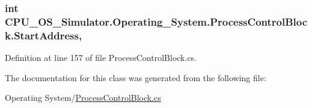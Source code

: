 \subsubsection[{Start\+Address}]{\setlength{\rightskip}{0pt plus 5cm}int C\+P\+U\+\_\+\+O\+S\+\_\+\+Simulator.\+Operating\+\_\+\+System.\+Process\+Control\+Block.\+Start\+Address\hspace{0.3cm}{\ttfamily [get]}, {\ttfamily [set]}}\label{class_c_p_u___o_s___simulator_1_1_operating___system_1_1_process_control_block_a0db4bf8588b286ebe82f80e3e00e2132}


Definition at line 157 of file Process\+Control\+Block.\+cs.



The documentation for this class was generated from the following file\+:\begin{DoxyCompactItemize}
\item 
Operating System/\hyperlink{_process_control_block_8cs}{Process\+Control\+Block.\+cs}\end{DoxyCompactItemize}
